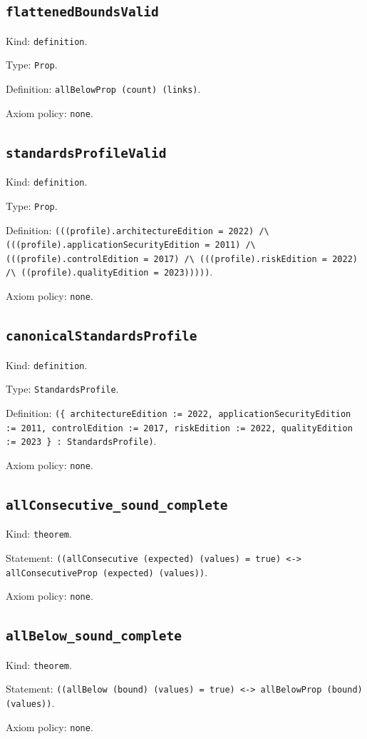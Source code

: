 \documentclass[11pt]{article}
\begin{document}
\subsection*{\texttt{flattenedBoundsValid}}
\noindent Kind: \texttt{definition}.\par
\noindent Type: \texttt{Prop}.\par
\noindent Definition: \texttt{allBelowProp (count) (links)}.\par
\noindent Axiom policy: \texttt{none}.\par
\subsection*{\texttt{standardsProfileValid}}
\noindent Kind: \texttt{definition}.\par
\noindent Type: \texttt{Prop}.\par
\noindent Definition: \texttt{(((profile).architectureEdition = 2022) /\textbackslash{} (((profile).applicationSecurityEdition = 2011) /\textbackslash{} (((profile).controlEdition = 2017) /\textbackslash{} (((profile).riskEdition = 2022) /\textbackslash{} ((profile).qualityEdition = 2023)))))}.\par
\noindent Axiom policy: \texttt{none}.\par
\subsection*{\texttt{canonicalStandardsProfile}}
\noindent Kind: \texttt{definition}.\par
\noindent Type: \texttt{StandardsProfile}.\par
\noindent Definition: \texttt{(\{ architectureEdition := 2022, applicationSecurityEdition := 2011, controlEdition := 2017, riskEdition := 2022, qualityEdition := 2023 \} : StandardsProfile)}.\par
\noindent Axiom policy: \texttt{none}.\par
\subsection*{\texttt{allConsecutive\_sound\_complete}}
\noindent Kind: \texttt{theorem}.\par
\noindent Statement: \texttt{((allConsecutive (expected) (values) = true) <-> allConsecutiveProp (expected) (values))}.\par
\noindent Axiom policy: \texttt{none}.\par
\subsection*{\texttt{allBelow\_sound\_complete}}
\noindent Kind: \texttt{theorem}.\par
\noindent Statement: \texttt{((allBelow (bound) (values) = true) <-> allBelowProp (bound) (values))}.\par
\noindent Axiom policy: \texttt{none}.\par
\end{document}
